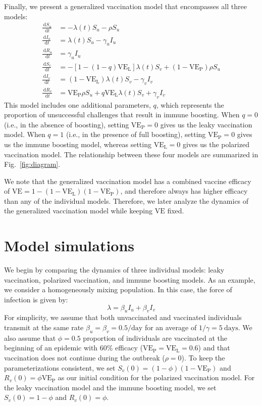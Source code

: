 \documentclass[12pt]{article}
\newcommand{\fref}[1]{Fig.~\ref{fig:#1}}
\newcommand{\dd}[1]{\ensuremath{\, \mathrm{d}#1}}
\newcommand{\VE}{\ensuremath{\mathrm{VE}}}
\newcommand{\VEP}{\ensuremath{\VE_{\mathrm{P}}}}
\newcommand{\VEL}{\ensuremath{\VE_{\mathrm{L}}}}
\begin{document}
Finally, we present a generalized vaccination model that encompasses all three models:
\begin{align}
\frac{\dd S_u}{\dd t} &= - \lambda(t) S_u - \rho S_u \\
\frac{\dd I_u}{\dd t} &= \lambda(t) S_u - \gamma_u I_u \\
\frac{\dd R_u}{\dd t} &= \gamma_u I_u \\
\frac{\dd S_v}{\dd t} &= - [1- (1-q) \VEL] \lambda(t) S_v + (1-\VEP) \rho S_u \\
\frac{\dd I_v}{\dd t} &= (1-\VEL) \lambda(t) S_v - \gamma_v I_v \\
\frac{\dd R_v}{\dd t} &= \VEP \rho S_u + q \VEL \lambda(t) S_v + \gamma_v I_v
\end{align}
This model includes one additional parameters, $q$, which represents the proportion of unsuccessful challenges that result in immune boosting.
When $q=0$ (i.e., in the absence of boosting), setting $\VEP = 0$ gives us the leaky vaccination model. 
When $q=1$ (i.e., in the presence of full boosting), setting $\VEP = 0$ gives us the immune boosting model, whereas setting $\VEL = 0$ gives us the polarized vaccination model. 
The relationship between these four models are summarized in \fref{diagram}.

We note that the generalized vaccination model has a combined vaccine efficacy of $\VE = 1- (1-\VEL) (1-\VEP)$, and therefore always has higher efficacy than any of the individual models.
Therefore, we later analyze the dynamics of the generalized vaccination model while keeping $\VE$ fixed.

\section*{Model simulations}

We begin by comparing the dynamics of three individual models: leaky vaccination, polarized vaccination, and immune boosting models.
As an example, we consider a homogeneously mixing population. In this case, the force of infection is given by:
\begin{equation}
\lambda = \beta_u I_u + \beta_v I_v
\end{equation}
For simplicity, we assume that both unvaccinated and vaccinated individuals transmit at the same rate $\beta_u = \beta_v =0.5/\mathrm{day}$ for an average of $1/\gamma=5~\mathrm{days}$.
We also assume that $\phi = 0.5$ proportion of individuals are vaccinated at the beginning of an epidemic with 60\% efficacy ($\VEP=\VEL=0.6$) and that vaccination does not continue during the outbreak ($\rho = 0$).
To keep the parameterizations consistent, we set $S_v(0) = (1-\phi) (1-\VEP)$ and $R_v(0) = \phi \VEP$ as our initial condition for the polarized vaccination model.
For the leaky vaccination model and the immune boosting model, we set $S_v(0) = 1-\phi$ and $R_v(0) = \phi$.
\end{document}
